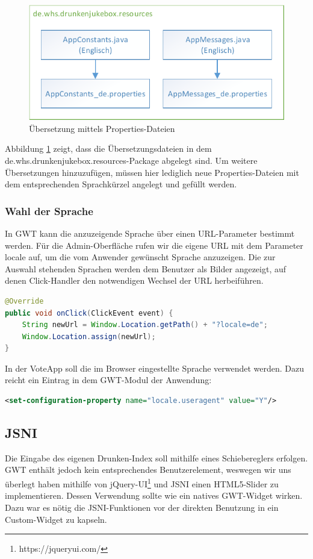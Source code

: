 \begin{figure}[tbh]
\centering
\includegraphics[width=0.7\linewidth]{Bilder/Lokalisierung}
\caption{Übersetzung mittels Properties-Dateien}
\label{fig:Lokalisierung}
\end{figure}

Abbildung \ref{fig:Lokalisierung} zeigt, dass die Übersetzungsdateien in dem
de.whs.drunkenjukebox.resources-Package abgelegt sind. Um weitere
Übersetzungen hinzuzufügen, müssen hier lediglich neue Properties-Dateien mit
dem entsprechenden Sprachkürzel angelegt und gefüllt werden.


\subsubsection{Wahl der Sprache}
In GWT kann die anzuzeigende Sprache über einen URL-Parameter bestimmt werden. Für die Admin-Oberfläche rufen wir die eigene URL
mit dem Parameter locale auf, um die vom Anwender
gewünscht Sprache anzuzeigen. Die zur Auswahl stehenden Sprachen werden dem Benutzer als Bilder angezeigt, auf denen Click-Handler den notwendigen Wechsel der URL herbeiführen.
\begin{lstlisting}[language=Java]
@Override
public void onClick(ClickEvent event) {
	String newUrl = Window.Location.getPath() + "?locale=de";
	Window.Location.assign(newUrl);
}
\end{lstlisting}
In der VoteApp soll die im Browser eingestellte Sprache verwendet werden. Dazu reicht ein Eintrag in dem GWT-Modul
der Anwendung:
\begin{lstlisting}[language=XML]
<set-configuration-property name="locale.useragent" value="Y"/>
\end{lstlisting}

\subsection{JSNI}
Die Eingabe des eigenen Drunken-Index soll mithilfe eines Schiebereglers erfolgen. GWT enthält jedoch kein entsprechendes  Benutzerelement, weswegen wir uns überlegt haben mithilfe von jQuery-UI\footnote{https://jqueryui.com/} und JSNI einen HTML5-Slider zu implementieren. Dessen Verwendung sollte wie ein natives GWT-Widget wirken. Dazu war es nötig die JSNI-Funktionen vor der direkten Benutzung in ein Custom-Widget zu kapseln. 


